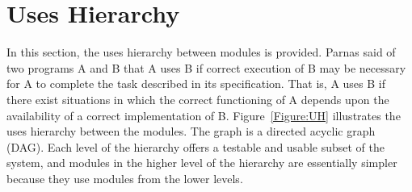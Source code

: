 \documentclass[12pt]{article}
\begin{document}
\section{Uses Hierarchy}
\label{Sec:UsesHier}
In this section, the uses hierarchy between modules is provided. Parnas said of two programs A and B that A uses B if correct execution of B may be necessary for A to complete the task described in its specification. That is, A uses B if there exist situations in which the correct functioning of A depends upon the availability of a correct implementation of B. Figure~\ref{Figure:UH} illustrates the uses hierarchy between the modules. The graph is a directed acyclic graph (DAG). Each level of the hierarchy offers a testable and usable subset of the system, and modules in the higher level of the hierarchy are essentially simpler because they use modules from the lower levels.
\end{document}
